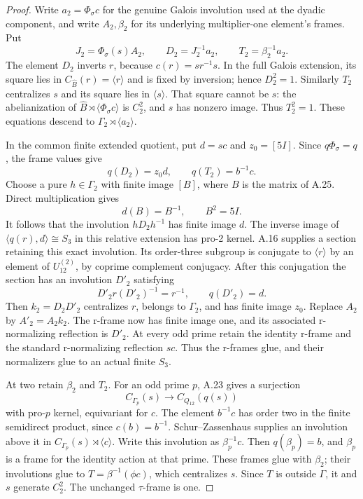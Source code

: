 \begin{proof}
Write \(a_2=\Phi_\sigma c\) for the genuine
Galois involution used at the dyadic component,
and write \(A_2,\beta_2\) for its underlying
multiplier-one element's frames. Put
\[
 J_2=\Phi_\sigma(s)A_2,
 \qquad D_2=J_2^{-1}a_2,
 \qquad T_2=\beta_2^{-1}a_2.
\]
The element \(D_2\) inverts \(r\), because
\(c(r)=sr^{-1}s\). In the full Galois extension,
its square lies in \(C_{\widehat B}(r)=\langle r\rangle\)
and is fixed by inversion; hence \(D_2^2=1\).
Similarly \(T_2\) centralizes \(s\) and its
square lies in \(\langle s\rangle\). That square
cannot be \(s\): the abelianization of
\(\widehat B\rtimes\langle\Phi_\sigma c\rangle\)
is \(C_2^2\), and \(s\) has nonzero image.
Thus \(T_2^2=1\). These equations descend to
\(\Gamma_2\rtimes\langle a_2\rangle\).

In the common finite extended quotient, put
\(d=sc\) and \(z_0=[5I]\). Since
\(q\Phi_\sigma=q\), the frame values give
\[
                       q(D_2)=z_0d,
                       \qquad q(T_2)=b^{-1}c.
\]
Choose a pure \(h\in\Gamma_2\) with finite
image \([B]\), where \(B\) is the matrix of
A.25. Direct multiplication gives
\[
             d(B)=B^{-1},\qquad B^2=5I.
\]
It follows that the involution \(hD_2h^{-1}\)
has finite image \(d\). The inverse image of
\(\langle q(r),d\rangle\cong S_3\) in this
relative extension has pro-2 kernel. A.16 supplies
a section retaining this exact involution. Its
order-three subgroup is conjugate to \(\langle r\rangle\)
by an element of \(U_{12}^{(2)}\), by coprime
complement conjugacy. After this conjugation the
section has an involution \(D'_2\) satisfying
\[
        D'_2r(D'_2)^{-1}=r^{-1},\qquad q(D'_2)=d.
\]
Then \(k_2=D_2D'_2\) centralizes \(r\), belongs
to \(\Gamma_2\), and has finite image \(z_0\).
Replace \(A_2\) by \(A'_2=A_2k_2\).
The r-frame now has finite image one, and its
associated r-normalizing reflection is \(D'_2\).
At every odd prime retain the identity r-frame
and the standard r-normalizing reflection \(sc\).
Thus the r-frames glue, and their normalizers
glue to an actual finite \(S_3\).

At two retain \(\beta_2\) and \(T_2\).
For an odd prime \(p\), A.23 gives a surjection
\[
             C_{\Gamma_p}(s)\longrightarrow C_{Q_{12}}(q(s))
\]
with pro-\(p\) kernel, equivariant for \(c\).
The element \(b^{-1}c\) has order two in the
finite semidirect product, since \(c(b)=b^{-1}\).
Schur--Zassenhaus supplies an involution above it
in \(C_{\Gamma_p}(s)\rtimes\langle c\rangle\).
Write this involution as \(\beta_p^{-1}c\).
Then \(q(\beta_p)=b\), and \(\beta_p\) is a
frame for the identity action at that prime.
These frames glue with \(\beta_2\); their
involutions glue to \(T=\beta^{-1}(\phi c)\),
which centralizes \(s\). Since \(T\) is outside
\(\Gamma\), it and \(s\) generate \(C_2^2\).
The unchanged \(\tau\)-frame is one.


\end{proof}
